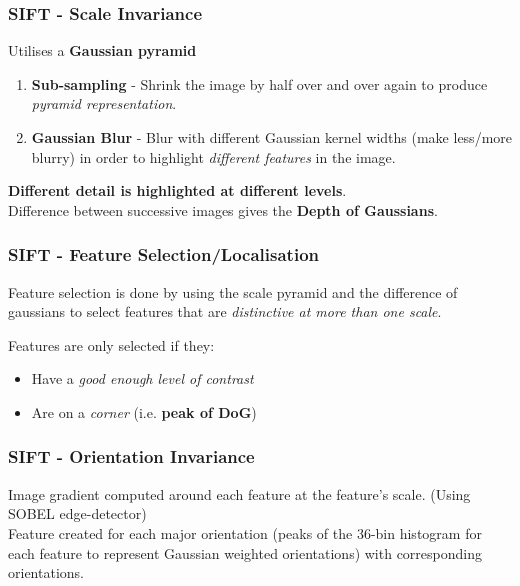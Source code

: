 \documentclass[english, 10pt]{article}
\begin{document}
\subsubsection{SIFT - Scale Invariance}

  Utilises a \textbf{Gaussian pyramid}

  \begin{enumerate}
  \def\labelenumi{\arabic{enumi}.}
  \itemsep1pt\parskip0pt
  \item
   \textbf{Sub-sampling} - Shrink the image by half over and over again to
    produce \emph{pyramid representation}.
  \item
    \textbf{Gaussian Blur} - Blur with different Gaussian kernel widths (make
    less/more blurry) in order to highlight \emph{different features} in
    the image.
  \end{enumerate}
  

  \textbf{Different detail is highlighted at different levels}. \\

  Difference between successive images gives the \textbf{Depth of Gaussians}.
 
\subsubsection{SIFT - Feature Selection/Localisation}

  Feature selection is done by using the scale pyramid and the
  difference of gaussians to select features that are \emph{distinctive
  at more than one scale}.

  Features are only selected if they:
  
  \begin{itemize}
  \itemsep1pt\parskip0pt
  \item
    Have a \emph{good enough level of contrast}
  \item
    Are on a \emph{corner} (i.e. \textbf{peak of DoG})
  \end{itemize}

\subsubsection{SIFT - Orientation Invariance}

  Image gradient computed around each feature at the feature's scale.
  (Using SOBEL edge-detector) \\
  
  Feature created for each major orientation (peaks of the 36-bin
  histogram for each feature to represent Gaussian weighted
  orientations) with corresponding orientations.
\end{document}
